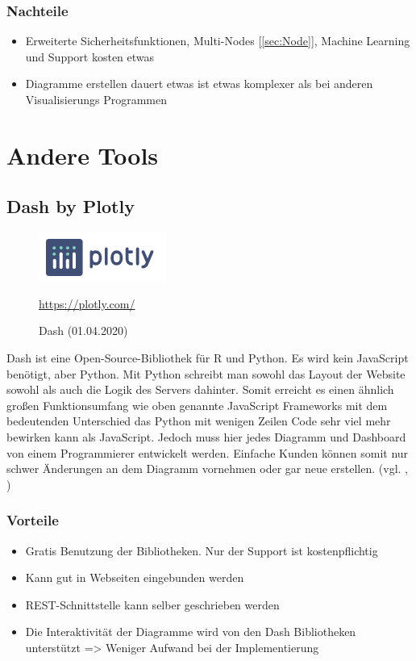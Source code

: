 \subsubsection{Nachteile}
\begin{itemize}
\item Erweiterte Sicherheitsfunktionen, Multi-Nodes [\ref{sec:Node}], Machine Learning und Support kosten etwas
\item Diagramme erstellen dauert etwas ist etwas komplexer als bei anderen Visualisierungs Programmen
\end{itemize}
\section{Andere Tools}
\subsection{Dash by Plotly}
\begin{figure}[H]
    \includegraphics[scale=1.3]{images/plotlyLogo.PNG}
    \caption{Dash (01.04.2020)}
    \centering
    \url{https://plotly.com/} 
\end{figure}
Dash ist eine Open-Source-Bibliothek für R und Python. Es wird kein JavaScript benötigt, aber Python. Mit Python schreibt man sowohl das Layout der Website sowohl als auch die Logik des Servers dahinter. Somit erreicht es einen ähnlich großen Funktionsumfang wie oben genannte JavaScript Frameworks mit dem bedeutenden Unterschied das Python mit wenigen Zeilen Code sehr viel mehr bewirken kann als JavaScript. Jedoch muss hier jedes Diagramm und Dashboard von einem Programmierer entwickelt werden. Einfache Kunden können somit nur schwer Änderungen an dem Diagramm vornehmen oder gar neue erstellen. (vgl. \cite{noauthor_dash_2019}, \cite{noauthor_dash_2019-1})
\subsubsection{Vorteile} 
\begin{itemize}
\item Gratis Benutzung der Bibliotheken. Nur der Support ist kostenpflichtig
\item Kann gut in Webseiten eingebunden werden
\item REST-Schnittstelle kann selber geschrieben werden
\item Die Interaktivität der Diagramme wird von den Dash Bibliotheken unterstützt => Weniger Aufwand bei der Implementierung
\end{itemize}
